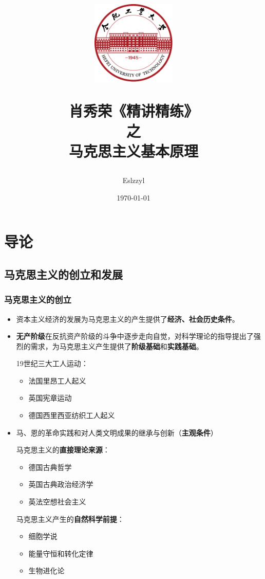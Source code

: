 \documentclass[12pt, a4paper, oneside]{ctexart}
\title{
    \includegraphics[width=0.3\textwidth]{../../../share/images/hfut-badge.pdf}
    
    \vspace{20pt}
    肖秀荣《精讲精练》\\ 之 \\ 马克思主义基本原理
}
\author{Eslzzyl}
\date{\today}
\begin{document}
\maketitle
\newpage
\tableofcontents
\vspace{20pt}

\newpage

\section{导论}

\subsection{马克思主义的创立和发展}

\subsubsection{马克思主义的创立}

\begin{itemize}
  \item 资本主义经济的发展为马克思主义的产生提供了\textbf{经济、社会历史条件}。
  \item \textbf{无产阶级}在反抗资产阶级的斗争中逐步走向自觉，对科学理论的指导提出了强烈的需求，为马克思主义产生提供了\textbf{阶级基础}和\textbf{实践基础}。
  
  19世纪三大工人运动：
  \begin{itemize}
    \item 法国里昂工人起义
    \item 英国宪章运动
    \item 德国西里西亚纺织工人起义
  \end{itemize}

  \item 马、恩的革命实践和对人类文明成果的继承与创新（\textbf{主观条件}）
  
  马克思主义的\textbf{直接理论来源}：
  \begin{itemize}
    \item 德国古典哲学
    \item 英国古典政治经济学
    \item 英法空想社会主义
  \end{itemize}

  马克思主义产生的\textbf{自然科学前提}：
  \begin{itemize}
    \item 细胞学说
    \item 能量守恒和转化定律
    \item 生物进化论
  \end{itemize}
\end{itemize}
\end{document}
